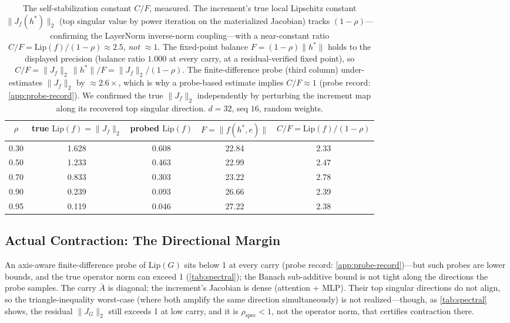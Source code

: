 \documentclass[11pt]{article}
\begin{document}
\begin{table}[ht]
\centering
\begin{tabular}{@{}ccccc@{}}
\toprule
$\rho$ & true $\text{Lip}(f) = \|J_f\|_2$ & probed $\text{Lip}(f)$ & $F = \|f(h^*,e)\|$ & $C/F = \text{Lip}(f)/(1-\rho)$ \\
\midrule
0.30 & 1.628 & 0.608 & 22.84 & 2.33 \\
0.50 & 1.233 & 0.463 & 22.99 & 2.47 \\
0.70 & 0.833 & 0.303 & 23.22 & 2.78 \\
0.90 & 0.239 & 0.093 & 26.66 & 2.39 \\
0.95 & 0.119 & 0.046 & 27.22 & 2.38 \\
\bottomrule
\end{tabular}
\caption{The self-stabilization constant $C/F$, measured. The increment's true local Lipschitz constant $\|J_f(h^*)\|_2$ (top singular value by power iteration on the materialized Jacobian) tracks $(1-\rho)$---confirming the LayerNorm inverse-norm coupling---with a near-constant ratio $C/F = \text{Lip}(f)/(1-\rho) \approx 2.5$, \emph{not} $\approx 1$. The fixed-point balance $F = (1-\rho)\|h^*\|$ holds to the displayed precision (balance ratio $1.000$ at every carry, at a residual-verified fixed point), so $C/F = \|J_f\|_2\,\|h^*\|/F = \|J_f\|_2/(1-\rho)$. The finite-difference probe (third column) under-estimates $\|J_f\|_2$ by $\approx 2.6\times$, which is why a probe-based estimate implies $C/F \approx 1$ (probe record: \cref{app:probe-record}). We confirmed the true $\|J_f\|_2$ independently by perturbing the increment map along its recovered top singular direction. $d=32$, seq $16$, random weights.}
\label{tab:cf}
\end{table}

\subsection{Actual Contraction: The Directional Margin}
\label{subsec:directional}

An axis-aware finite-difference probe of $\text{Lip}(G)$ sits below 1 at every carry (probe record: \cref{app:probe-record})---but such probes are lower bounds, and the true operator norm can exceed 1 (\cref{tab:spectral}); the Banach sub-additive bound is not tight along the directions the probe samples. The carry $\bar{A}$ is diagonal; the increment's Jacobian is dense (attention + MLP). Their top singular directions do not align, so the triangle-inequality worst-case (where both amplify the same direction simultaneously) is not realized---though, as \cref{tab:spectral} shows, the residual $\|J_G\|_2$ still exceeds 1 at low carry, and it is $\rho_{\text{spec}} < 1$, not the operator norm, that certifies contraction there.
\end{document}
